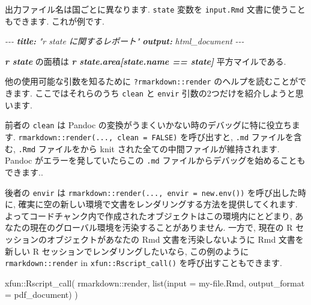 \documentclass[
  11pt,
]{bxjsreport}
\newenvironment{Shaded}{\begin{snugshade}}{\end{snugshade}}
\newcommand{\AnnotationTok}[1]{\textcolor[rgb]{0.56,0.35,0.01}{\textbf{\textit{#1}}}}
\newcommand{\AttributeTok}[1]{\textcolor[rgb]{0.77,0.63,0.00}{#1}}
\newcommand{\CommentTok}[1]{\textcolor[rgb]{0.56,0.35,0.01}{\textit{#1}}}
\newcommand{\FunctionTok}[1]{\textcolor[rgb]{0.00,0.00,0.00}{#1}}
\newcommand{\InformationTok}[1]{\textcolor[rgb]{0.56,0.35,0.01}{\textbf{\textit{#1}}}}
\newcommand{\NormalTok}[1]{#1}
\newcommand{\SpecialCharTok}[1]{\textcolor[rgb]{0.00,0.00,0.00}{#1}}
\newcommand{\StringTok}[1]{\textcolor[rgb]{0.31,0.60,0.02}{#1}}
\begin{document}
出力ファイル名は国ごとに異なります. \texttt{state} 変数を \texttt{input.Rmd} 文書に使うこともできます. これが例です.

\begin{Shaded}
\begin{Highlighting}[]
\CommentTok{{-}{-}{-}}
\AnnotationTok{title:}\CommentTok{ "\textasciigrave{}r state\textasciigrave{} に関するレポート"}
\AnnotationTok{output:}\CommentTok{ html\_document}
\CommentTok{{-}{-}{-}}

\InformationTok{\textasciigrave{}r state\textasciigrave{}}\NormalTok{ の面積は }\InformationTok{\textasciigrave{}r state.area[state.name == state]\textasciigrave{}}\NormalTok{ 平方マイルである.}
\end{Highlighting}
\end{Shaded}

他の使用可能な引数を知るために \texttt{?rmarkdown::render} のヘルプを読むことができます. ここではそれらのうち \texttt{clean} と \texttt{envir} 引数の2つだけを紹介しようと思います.

前者の \texttt{clean} は Pandoc の変換がうまくいかない時のデバッグに特に役立ちます. \texttt{rmarkdown::render(..., clean = FALSE)} を呼び出すと, \texttt{.md} ファイルを含む, \texttt{.Rmd} ファイルをから knit された全ての中間ファイルが維持されます. Pandoc がエラーを発していたらこの \texttt{.md} ファイルからデバッグを始めることもできます..

後者の \texttt{envir} は \texttt{rmarkdown::render(..., envir = new.env())} を呼び出した時に, 確実に空の新しい環境で文書をレンダリングする方法を提供してくれます. よってコードチャンク内で作成されたオブジェクトはこの環境内にとどまり, あなたの現在のグローバル環境を汚染することがありません. 一方で, 現在の R セッションのオブジェクトがあなたの Rmd 文書を汚染しないように Rmd 文書を新しい R セッションでレンダリングしたいなら, この例のように \texttt{rmarkdown::render} in \texttt{xfun::Rscript\_call()} を呼び出すこともできます.

\begin{Shaded}
\begin{Highlighting}[numbers=left,,]
\NormalTok{xfun}\SpecialCharTok{::}\FunctionTok{Rscript\_call}\NormalTok{(}
\NormalTok{  rmarkdown}\SpecialCharTok{::}\NormalTok{render,}
  \FunctionTok{list}\NormalTok{(}\AttributeTok{input =} \StringTok{\textquotesingle{}my{-}file.Rmd\textquotesingle{}}\NormalTok{, }\AttributeTok{output\_format =} \StringTok{\textquotesingle{}pdf\_document\textquotesingle{}}\NormalTok{)}
\NormalTok{)}
\end{Highlighting}
\end{Shaded}
\end{document}
